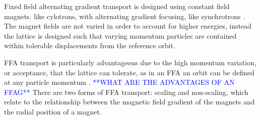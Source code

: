 \documentclass[../main.tex]{subfiles}
\begin{document}
Fixed field alternating gradient transport is designed using constant field magnets. like cylotrons, with alternating gradient focusing, like synchrotrons \cite{machida2013fixed}. The magnet fields are not varied in order to account for higher energies, instead the lattice is designed such that varying momentum particles are contained within tolerable displacements from the reference orbit. 

FFA transport is particularly advantageous due to the high momentum variation, or acceptance, that the lattice can tolerate, as in an FFA an orbit can be defined at any particle momentum \cite{barlow2010emma}. \textcolor{blue}{**WHAT ARE THE ADVANTAGES OF AN FFAG**} There are two forms of FFA transport: scaling and non-scaling, which relate to the relationship between the magnetic field gradient of the magnets and the radial position of a magnet.
\end{document}
